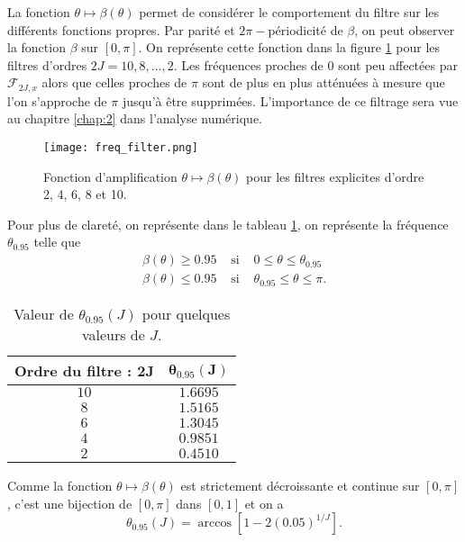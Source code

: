 La fonction $\theta \mapsto \beta(\theta)$ permet de considérer le comportement du filtre sur les différents fonctions propres. Par parité et $2 \pi -$périodicité de $\beta$, on peut observer la fonction $\beta$ sur $[0,\pi]$. On représente cette fonction dans la figure \ref{fig:freq_filter} pour les filtres d'ordres $2J = 10, 8, ..., 2$. Les fréquences proches de 0 sont peu affectées par $\mathcal{F}_{2J,x}$ alors que celles proches de $\pi$ sont de plus en plus atténuées à mesure que l'on s'approche de $\pi$ jusqu'à être supprimées. L'importance de ce filtrage sera vue au chapitre \ref{chap:2} dans l'analyse numérique.

\begin{figure}[htbp]
\begin{center}
\texttt{[image: freq\_filter.png]}
\end{center}
\caption{Fonction d'amplification $\theta \mapsto \beta(\theta)$ pour les filtres explicites d'ordre 2, 4, 6, 8 et 10.}
\label{fig:freq_filter}
\end{figure}
Pour plus de clareté, on représente dans le tableau \ref{tab:filter_095}, on représente la fréquence $\theta_{0.95}$ telle que
\begin{equation}
\begin{array}{rcl}
\beta(\theta) \geq 0.95 & \text{ si } & 0 \leq \theta \leq \theta_{0.95} \\
\beta(\theta) \leq 0.95 & \text{ si } & \theta_{0.95} \leq \theta \leq \pi.
\end{array}
\end{equation}

\begin{table}
\begin{center}
\begin{tabular}{|c||c|}
\hline
\textbf{Ordre du filtre : }$\mathbf{2J}$ & $\mathbf{\theta_{0.95}(J)}$\\
\hline
\hline
$10$&$1.6695$\\
$8$&$1.5165$\\
$6$&$1.3045$\\
$4$&$0.9851$\\
$2$&$0.4510$\\
\hline
\end{tabular}
\end{center}
\caption{Valeur de $\theta_{0.95}(J)$ pour quelques valeurs de $J$.}
\label{tab:filter_095}
\end{table}

Comme la fonction $\theta \mapsto \beta(\theta)$ est strictement décroissante et continue sur $[0,\pi]$, c'est une bijection de $[0,\pi]$ dans $[0,1]$ et on a 
\begin{equation}
\theta_{0.95}(J) = \arccos \left[ 1-2 (0.05)^{1/J} \right].
\end{equation}


